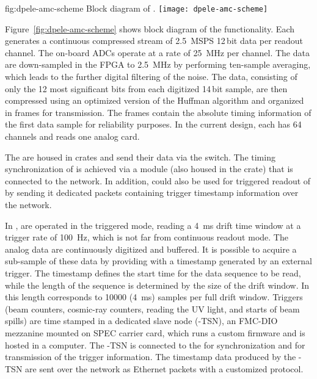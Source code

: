 
\begin{dunefigure}{fig:dpele-amc-scheme}
{Block diagram of .}
\texttt{[image: dpele-amc-scheme]}
\end{dunefigure}
Figure~\ref{fig:dpele-amc-scheme} shows block diagram of the  functionality. Each  generates a continuous compressed stream of \SI{2.5}{MSPS} \num{12}\,bit data per readout channel. The on-board ADCs operate at a rate of \SI{25}{\MHz} per channel. The data are down-sampled in the FPGA to \SI{2.5}{\MHz} by performing ten-sample averaging, which leads to the further digital filtering of the noise. The data, consisting of only the  \num{12} most significant bits from each digitized \num{14}\,bit sample, are then compressed using an optimized version of the Huffman algorithm and organized in frames for transmission.  The frames contain the absolute timing information of the first data sample for reliability purposes. In the current design, each  has \num{64} channels and reads one analog  card.

The  are housed in  crates and send their data via the  switch. The timing synchronization of  is achieved via a  module (also housed in the crate) that is connected to the  network. In addition,  could also be used for triggered readout of  by sending it dedicated packets containing trigger timestamp information over the  network.

In ,  are operated in the triggered mode, reading a \SI{4}{\milli\second} drift time window at a trigger rate of \SI{100}{Hz}, which is not far from %
continuous readout mode. The analog data are continuously digitized and buffered. It is possible to acquire a sub-sample of these data %
by providing  with a timestamp generated by an external trigger. The timestamp defines the start time for the data sequence to be read, while the length of the sequence is determined by the size of the drift window. In  this length corresponds to \num{10000} (\SI{4}{\milli\second}) samples per full drift window. 
 Triggers (beam counters, cosmic-ray counters,  reading the UV light, and starts of beam spills) are time stamped in a dedicated  slave node (-TSN), an FMC-DIO mezzanine mounted on  SPEC carrier card, which runs a custom firmware and is hosted in a computer. The -TSN is connected to the  for synchronization and for transmission of the trigger information. The timestamp data produced by the -TSN are sent over the  network as Ethernet packets with a customized protocol. 

